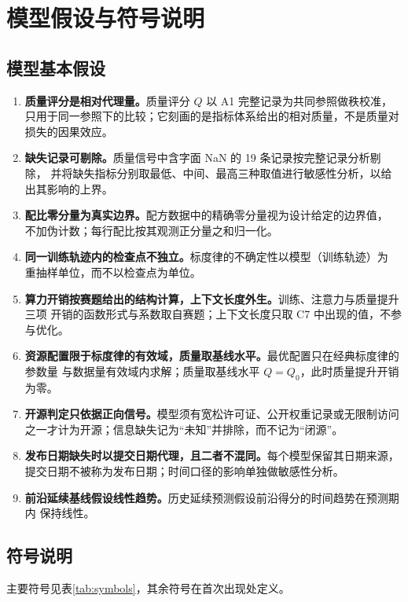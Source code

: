 \section{模型假设与符号说明}

\subsection{模型基本假设}

\begin{enumerate}
  \item \textbf{质量评分是相对代理量。}质量评分 $Q$ 以 A1 完整记录为共同参照做秩校准，
        只用于同一参照下的比较；它刻画的是指标体系给出的相对质量，不是质量对损失的因果效应。
  \item \textbf{缺失记录可剔除。}质量信号中含字面 NaN 的 19 条记录按完整记录分析剔除，
        并将缺失指标分别取最低、中间、最高三种取值进行敏感性分析，以给出其影响的上界。
  \item \textbf{配比零分量为真实边界。}配方数据中的精确零分量视为设计给定的边界值，
        不加伪计数；每行配比按其观测正分量之和归一化。
  \item \textbf{同一训练轨迹内的检查点不独立。}标度律的不确定性以模型（训练轨迹）为
        重抽样单位，而不以检查点为单位。
  \item \textbf{算力开销按赛题给出的结构计算，上下文长度外生。}训练、注意力与质量提升三项
        开销的函数形式与系数取自赛题；上下文长度只取 C7 中出现的值，不参与优化。
  \item \textbf{资源配置限于标度律的有效域，质量取基线水平。}最优配置只在经典标度律的参数量
        与数据量有效域内求解；质量取基线水平 $Q=Q_0$，此时质量提升开销为零。
  \item \textbf{开源判定只依据正向信号。}模型须有宽松许可证、公开权重记录或无限制访问
        之一才计为开源；信息缺失记为“未知”并排除，而不记为“闭源”。
  \item \textbf{发布日期缺失时以提交日期代理，且二者不混同。}每个模型保留其日期来源，
        提交日期不被称为发布日期；时间口径的影响单独做敏感性分析。
  \item \textbf{前沿延续基线假设线性趋势。}历史延续预测假设前沿得分的时间趋势在预测期内
        保持线性。
\end{enumerate}

\subsection{符号说明}

主要符号见表\ref{tab:symbols}，其余符号在首次出现处定义。


